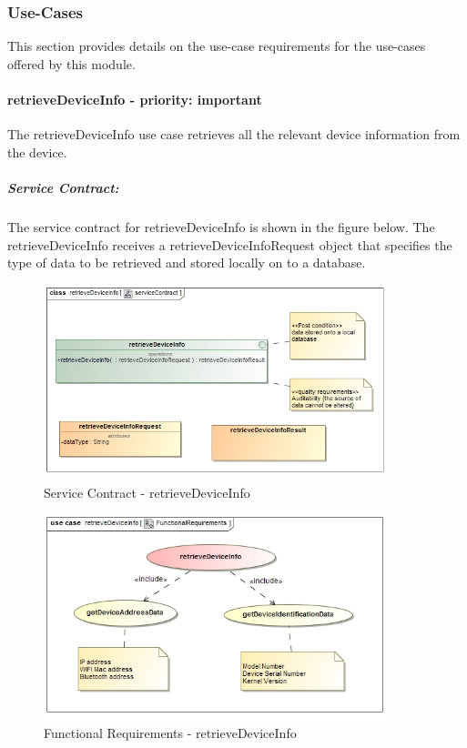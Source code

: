 \documentclass[hidelinks, 12pt, oneside]{article}
\begin{document}
		
	\subsubsection{Use-Cases}
		This section provides details on the use-case requirements for the use-cases offered by this module.	
		
	\paragraph{retrieveDeviceInfo - priority: important}
		The retrieveDeviceInfo use case retrieves all the relevant device information from the device.\newline
		
		\subparagraph{Service Contract:}
		The service contract for retrieveDeviceInfo is shown in the figure below. The retrieveDeviceInfo 			receives a retrieveDeviceInfoRequest object that specifies the type of data to be retrieved and 			stored locally on to a database.
		
		
		\begin{figure}[!htbp]
    		\centering
    		\includegraphics[width=0.9\textwidth]{img/serviceContractRetrieveDeviceInfo.jpg}
    		\caption{Service Contract - retrieveDeviceInfo}
    		\label{fig:ServiceCon_retrieveDeviceInfo}
		\end{figure}
				
		
		\begin{figure}[!htbp]
    		\centering
    		\includegraphics[width=0.9\textwidth]{img/functionalRequirementsRetrieveDeviceInfo.jpg}
    		\caption{Functional Requirements - retrieveDeviceInfo}
    		\label{fig:FunctionalReq_retrieveDeviceInfo}
		\end{figure}
		
\end{document}
